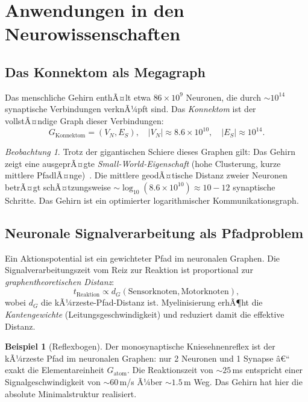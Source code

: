 ﻿\documentclass[12pt,a4paper,twoside]{article}
\theoremstyle{definition}
\newtheorem{beispiel}{Beispiel}[section]
\theoremstyle{plain}
\theoremstyle{remark}
\newtheorem{beobachtung}{Beobachtung}[section]
\begin{document}
\section{Anwendungen in den Neurowissenschaften}
\label{sec:neuro}

\subsection{Das Konnektom als Megagraph}

Das menschliche Gehirn enthÃ¤lt etwa $86 \times 10^9$ Neuronen,
die durch $\sim 10^{14}$ synaptische Verbindungen verknÃ¼pft
sind.  Das \emph{Konnektom} ist der vollstÃ¤ndige Graph dieser
Verbindungen:
\[
  G_{\text{Konnektom}} = (V_N, E_S), \quad
  |V_N| \approx 8.6 \times 10^{10}, \quad
  |E_S| \approx 10^{14}.
\]

\begin{beobachtung}
Trotz der gigantischen Schiere dieses Graphen gilt:  Das Gehirn
zeigt eine ausgeprÃ¤gte \emph{Small-World-Eigenschaft}
(hohe Clusterung, kurze mittlere PfadlÃ¤nge)~\cite{Watts1998}.
Die mittlere geodÃ¤tische Distanz zweier Neuronen betrÃ¤gt
schÃ¤tzungsweise $\sim \log_{10}(8.6 \times 10^{10}) \approx 10{-}12$
synaptische Schritte.  Das Gehirn ist ein optimierter
logarithmischer Kommunikationsgraph.
\end{beobachtung}

\subsection{Neuronale Signalverarbeitung als Pfadproblem}

Ein Aktionspotential ist ein gewichteter Pfad im neuronalen
Graphen.  Die Signalverarbeitungszeit vom Reiz zur Reaktion ist
proportional zur \emph{graphentheoretischen Distanz}:
\[
  t_{\text{Reaktion}} \propto d_{G}(\text{Sensorknoten},
                                    \text{Motorknoten}),
\]
wobei $d_G$ die kÃ¼rzeste-Pfad-Distanz ist.  Myelinisierung
erhÃ¶ht die \emph{Kantengewichte} (Leitungsgeschwindigkeit)
und reduziert damit die effektive Distanz.

\begin{beispiel}[Reflexbogen]
Der monosynaptische Kniesehnenreflex ist der kÃ¼rzeste Pfad
im neuronalen Graphen: nur 2 Neuronen und 1 Synapse â€“
exakt die Elementareinheit $G_{\text{atom}}$.  Die
Reaktionszeit von $\sim 25\,$ms entspricht einer
Signalgeschwindigkeit von $\sim 60\,$m/s Ã¼ber $\sim 1.5\,$m Weg.
Das Gehirn hat hier die absolute Minimalstruktur realisiert.
\end{beispiel}
\end{document}
